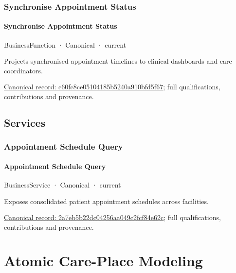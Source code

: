 \subsubsection{Synchronise Appointment Status}

\paragraph{Synchronise Appointment Status}

\label{element:c60fc8ce05104185b5240a910bfd5f67}
{\small BusinessFunction · Canonical · current}\par

Projects synchronised appointment timelines to clinical dashboards and care coordinators.


{\footnotesize \href{../../../../continuum/business/business-function/c60fc8ce05104185b5240a910bfd5f67.md}{Canonical record: c60fc8ce05104185b5240a910bfd5f67}; full qualifications, contributions and provenance.}\par
\subsection{Services}

\subsubsection{Appointment Schedule Query}

\paragraph{Appointment Schedule Query}

\label{element:2a7eb5b22dc04256aa049c2fcf84e62c}
{\small BusinessService · Canonical · current}\par

Exposes consolidated patient appointment schedules across facilities.


{\footnotesize \href{../../../../continuum/business/business-service/2a7eb5b22dc04256aa049c2fcf84e62c.md}{Canonical record: 2a7eb5b22dc04256aa049c2fcf84e62c}; full qualifications, contributions and provenance.}\par
\section{Atomic Care-Place Modeling}


